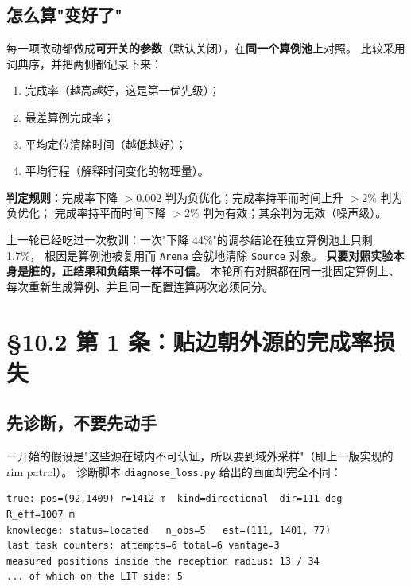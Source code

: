 \subsection{怎么算"变好了"}

每一项改动都做成\textbf{可开关的参数}（默认关闭），在\textbf{同一个算例池}上对照。
比较采用词典序，并把两侧都记录下来：

\begin{enumerate}[leftmargin=1.8em]
  \item 完成率（越高越好，这是第一优先级）；
  \item 最差算例完成率；
  \item 平均定位清除时间（越低越好）；
  \item 平均行程（解释时间变化的物理量）。
\end{enumerate}

\textbf{判定规则}：完成率下降 $>0.002$ 判为负优化；完成率持平而时间上升 $>2\%$ 判为负优化；
完成率持平而时间下降 $>2\%$ 判为有效；其余判为无效（噪声级）。

\begin{warnbox}[title=为什么必须把负结果写下来]
上一轮已经吃过一次教训：一次"下降 44\%"的调参结论在独立算例池上只剩 1.7\%，
根因是算例池被复用而 \texttt{Arena} 会就地清除 \texttt{Source} 对象。
\textbf{只要对照实验本身是脏的，正结果和负结果一样不可信}。
本轮所有对照都在同一批固定算例上、每次重新生成算例、并且同一配置连算两次必须同分。
\end{warnbox}

\section{§10.2 第 1 条：贴边朝外源的完成率损失}

\subsection{先诊断，不要先动手}

一开始的假设是"这些源在域内不可认证，所以要到域外采样"（即上一版实现的 rim patrol）。
诊断脚本 \texttt{diagnose\_loss.py} 给出的画面却完全不同：

\begin{lstlisting}[caption={失败算例的真实状态（seed 30017，频道 11）}]
true: pos=(92,1409) r=1412 m  kind=directional  dir=111 deg  R_eff=1007 m
knowledge: status=located   n_obs=5   est=(111, 1401, 77)
last task counters: attempts=6 total=6 vantage=3
measured positions inside the reception radius: 13 / 34
... of which on the LIT side: 5
\end{lstlisting}

